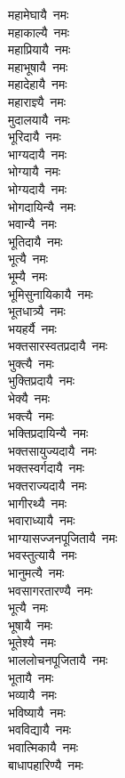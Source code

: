 \begin{flushleft}
\begin{multicols}{2}
महामेघायै~नमः\\
महाकाल्यै~नमः\\
महाप्रियायै~नमः\\
महाभूषायै~नमः\\
महादेहायै~नमः\\
महाराज्ञ्यै~नमः\hfill{}\\
मुदालयायै~नमः\\
भूरिदायै~नमः\\
भाग्यदायै~नमः\\
भोग्यायै~नमः\\
भोग्यदायै~नमः\\
भोगदायिन्यै~नमः\\
भवान्यै~नमः\\
भूतिदायै~नमः\\
भूत्यै~नमः\\
भूम्यै~नमः\hfill{}\\
भूमिसुनायिकायै~नमः\\
भूतधात्र्यै~नमः\\
भयहर्यै~नमः\\
भक्तसारस्वतप्रदायै~नमः\\
भुक्त्यै~नमः\\
भुक्तिप्रदायै~नमः\\
भेक्यै~नमः\\
भक्त्यै~नमः\\
भक्तिप्रदायिन्यै~नमः\\
भक्तसायुज्यदायै~नमः\hfill{}\\
भक्तस्वर्गदायै~नमः\\
भक्तराज्यदायै~नमः\\
भागीरथ्यै~नमः\\
भवाराध्यायै~नमः\\
भाग्यासज्जनपूजितायै~नमः\\
भवस्तुत्यायै~नमः\\
भानुमत्यै~नमः\\
भवसागरतारण्यै~नमः\\
भूत्यै~नमः\\
भूषायै~नमः\hfill{}\\
भूतेश्यै~नमः\\
भाललोचनपूजितायै~नमः\\
भूतायै~नमः\\
भव्यायै~नमः\\
भविष्यायै~नमः\\
भवविद्यायै~नमः\\
भवात्मिकायै~नमः\\
बाधापहारिण्यै~नमः\\

\end{multicols}
\end{flushleft}
